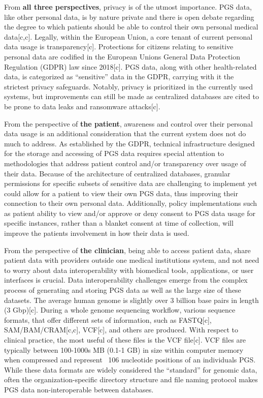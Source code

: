 \documentclass[11pt]{article}
\begin{document}
From \textbf{all three perspectives}, privacy is of the utmost importance. 
PGS data, like other personal data, is by nature private and there is open debate regarding the degree to which patients should be able to control their own personal medical data[c,c]. 
Legally, within the European Union, a core tenant of current personal data usage is transparency[c]. 
Protections for citizens relating to sensitive personal data are codified in the European Union\textquotesingle s General Data Protection Regulation (GDPR) law since 2018[c]. 
PGS data, along with other health-related data, is categorized as “sensitive” data in the GDPR, carrying with it the strictest privacy safeguards. 
Notably, privacy is prioritized in the currently used systems, but improvements can still be made as centralized databases are cited to be prone to data leaks and ransomware attacks[c]. 

From the perspective of \textbf{the patient}, awareness and control over their personal data usage is an additional consideration that the current system does not do much to address. 
As established by the GDPR, technical infrastructure designed for the storage and accessing of PGS data requires special attention to methodologies that address patient control and/or transparency over usage of their data. 
Because of the architecture of centralized databases, granular permissions for specific subsets of sensitive data are challenging to implement yet could allow for a patient to view their own PGS data, thus improving their connection to their own personal data. 
Additionally, policy implementations such as patient ability to view and/or approve or deny consent to PGS data usage for specific instances, rather than a blanket consent at time of collection, will improve the patient\textquotesingle s involvement in how their data is used. 

From the perspective of \textbf{the clinician}, being able to access patient data, share patient data with providers outside one medical institution\textquotesingle s system, and not need to worry about data interoperability with biomedical tools, applications, or user interfaces is crucial. 
Data interoperability challenges emerge from the complex process of generating and storing PGS data as well as the large size of these datasets. 
The average human genome is slightly over 3 billion base pairs in length (3 Gbp)[c]. 
During a whole genome sequencing workflow, various sequence formats, that offer different sets of information, such as FASTQ[c], SAM/BAM/CRAM[c,c], VCF[c], and others are produced. 
With respect to clinical practice, the most useful of these files is the VCF file[c]. 
VCF files are typically between 100-1000s MB (0.1-1 GB) in size within computer memory when compressed and represent ~106 nucleotide positions of an individual\textquotesingle s PGS. 
While these data formats are widely considered the “standard” for genomic data, often the organization-specific directory structure and file naming protocol makes PGS data non-interoperable between databases.
\end{document}
